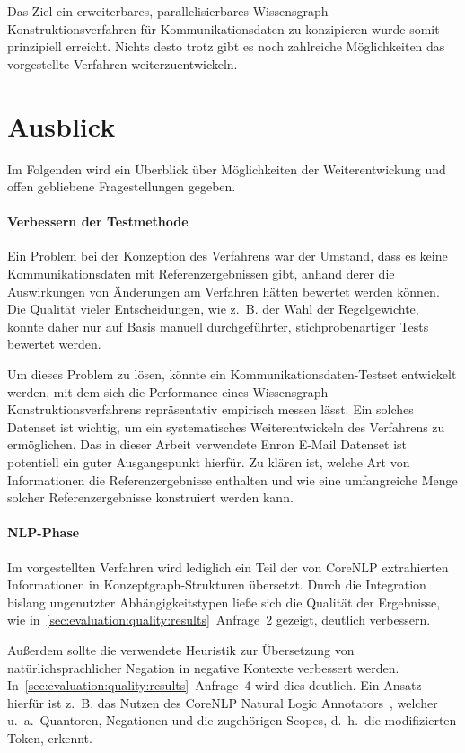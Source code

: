 Das Ziel ein erweiterbares, parallelisierbares Wissensgraph-Konstruktionsverfahren für Kommunikationsdaten zu konzipieren wurde somit prinzipiell erreicht.
Nichts desto trotz gibt es noch zahlreiche Möglichkeiten das vorgestellte Verfahren weiterzuentwickeln.

\section{Ausblick}%
\label{sec:conclusion:todo}

Im Folgenden wird ein Überblick über Möglichkeiten der Weiterentwickung und offen gebliebene Fragestellungen gegeben.

\paragraph{Verbessern der Testmethode}
Ein Problem bei der Konzeption des Verfahrens war der Umstand, dass es keine Kommunikationsdaten mit Referenzergebnissen gibt, anhand derer die Auswirkungen von Änderungen am Verfahren hätten bewertet werden können.
Die Qualität vieler Entscheidungen, wie z.~B. der Wahl der Regelgewichte, konnte daher nur auf Basis manuell durchgeführter, stichprobenartiger Tests bewertet werden.

Um dieses Problem zu lösen, könnte ein Kommunikationsdaten-Testset entwickelt werden, mit dem sich die Performance eines Wissensgraph-Konstruktionsverfahrens repräsentativ empirisch messen lässt.
Ein solches Datenset ist wichtig, um ein systematisches Weiterentwickeln des Verfahrens zu ermöglichen.
Das in dieser Arbeit verwendete Enron E-Mail Datenset ist potentiell ein guter Ausgangspunkt hierfür.
Zu klären ist, welche Art von Informationen die Referenzergebnisse enthalten und wie eine umfangreiche Menge solcher Referenzergebnisse konstruiert werden kann.

\paragraph{NLP-Phase}
Im vorgestellten Verfahren wird lediglich ein Teil der von CoreNLP extrahierten Informationen in Konzeptgraph-Strukturen übersetzt.
Durch die Integration bislang ungenutzter Abhängigkeitstypen ließe sich die Qualität der Ergebnisse, wie in~\ref{sec:evaluation:quality:results}~Anfrage~2 gezeigt, deutlich verbessern.

Außerdem sollte die verwendete Heuristik zur Übersetzung von natürlichsprachlicher Negation in negative Kontexte verbessert werden.
In~\ref{sec:evaluation:quality:results}~Anfrage~4 wird dies deutlich.
Ein Ansatz hierfür ist z.~B. das Nutzen des CoreNLP Natural Logic Annotators~\cite{MacCartney2007}, welcher u.~a.\ Quantoren, Negationen und die zugehörigen Scopes, d.~h.\ die modifizierten Token, erkennt.

